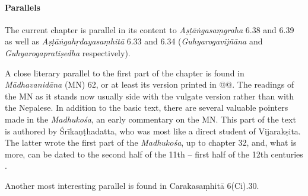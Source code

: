 
\paragraph*{Parallels}
The current chapter is parallel in its content to \textit{Aṣṭāṅgasaṃgraha} 6.38 and 6.39 as well as \textit{Aṣṭāṅgahṛdayasaṃhitā} 6.33 and 6.34 (\textit{Guhyarogavijñāna} and \textit{Guhyarogapratiṣedha} respectively).%

A close literary parallel to the first part of the chapter is found in \textit{Mādhavanidāna} (MN) 62, or at least its version printed in @@\citet{}. The readings of the MN as it stands now usually side with the vulgate version rather than with the Nepalese. In addition to the basic text, there are several valuable pointers made in the \textit{Madhukośa}, an early commentary on the MN. This part of the text is authored by Śrīkaṇṭhadatta, who was most like a direct student of Vijarakṣita. The latter wrote the first part of the \textit{Madhukośa}, up to chapter 32, and, what is more, can be dated to the second half of the 11th -- first half of the 12th centuries \citep[22--26]{meul-1974}.

Another most interesting parallel is found in Carakasaṃhitā 6(Ci).30.

